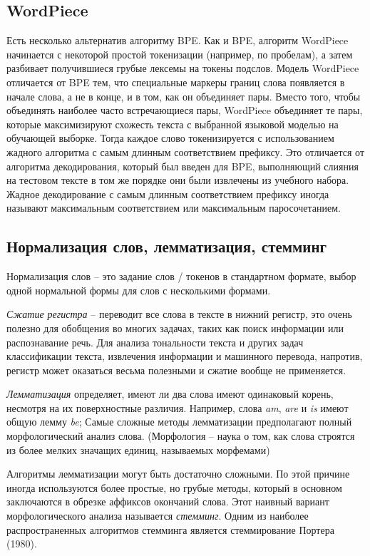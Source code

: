 \documentclass[a4paper,12pt,preview]{report} %
\begin{document}
	
	\subsection{WordPiece}
	
	Есть несколько альтернатив алгоритму BPE. Как и BPE, алгоритм WordPiece начинается с некоторой простой токенизации (например, по пробелам), а затем разбивает получившиеся грубые лексемы на токены подслов. Модель WordPiece отличается от BPE тем, что специальные маркеры границ слова появляется в начале слова, а не в конце, и в том, как он объединяет пары. Вместо того, чтобы объединять наиболее часто встречающиеся пары, WordPiece объединяет те пары, которые максимизируют схожесть текста с выбранной языковой моделью на обучающей выборке. Тогда каждое слово токенизируется с использованием жадного алгоритма с самым длинным соответствием префиксу. Это отличается от алгоритма декодирования, который был введен для BPE, выполняющий слияния
	на тестовом тексте в том же порядке они были извлечены из учебного набора.
	Жадное декодирование с самым длинным соответствием префиксу иногда называют максимальным соответствием или максимальным паросочетанием.
	
	\subsection{Нормализация слов, лемматизация, стемминг}
	Нормализация слов -- это задание слов / токенов в стандартном формате, выбор одной нормальной формы для слов с несколькими формами.
	
	\textit{Сжатие регистра} -- переводит все слова в тексте в нижний регистр, это очень полезно для обобщения во многих задачах, таких как поиск информации или распознавание речь. Для анализа тональности текста и других задач классификации текста, извлечения информации и машинного перевода, напротив, регистр может оказаться весьма полезными и
	сжатие вообще не применяется.
	
	\textit{Лемматизация} определяет, имеют ли два слова имеют одинаковый корень,	несмотря на их поверхностные различия. Например, слова \textit{am}, \textit{are} и \textit{is} имеют общую лемму \textit{be}; 
	Самые сложные методы лемматизации предполагают полный морфологический анализ слова. (Морфология -- наука о том, как слова строятся из более мелких значащих единиц, называемых морфемами)
	
	
	Алгоритмы лемматизации могут быть достаточно сложными. По этой причине иногда используются более простые, но грубые методы, который в основном заключаются в обрезке аффиксов окончаний слова. Этот наивный вариант морфологического анализа называется \textit{стемминг}. Одним из наиболее распространенных алгоритмов стемминга является стеммирование Портера (1980). \cite{6}\\
	
\end{document}
